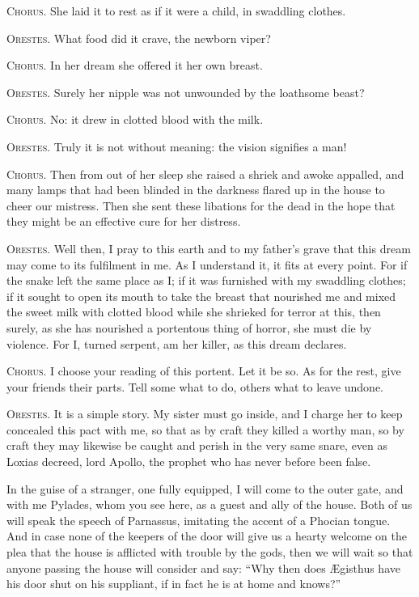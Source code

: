 \documentclass[12pt]{article}
\begin{document}
\textsc{Chorus.} She laid it to rest as if it were a child, in swaddling clothes.

\textsc{Orestes.} What food did it crave, the newborn viper?

\textsc{Chorus.} In her dream she offered it her own breast.

\textsc{Orestes.} Surely her nipple was not unwounded by the loathsome beast?

\textsc{Chorus.} No: it drew in clotted blood with the milk.

\textsc{Orestes.} Truly it is not without meaning: the vision signifies a man!

\textsc{Chorus.} Then from out of her sleep she raised a shriek and awoke appalled, and many lamps that had been blinded in the darkness flared up in the house to cheer our mistress. Then she sent these libations for the dead in the hope that they might be an effective cure for her distress.

\textsc{Orestes.} Well then, I pray to this earth and to my father's grave that this dream may come to its fulfilment in me. As I understand it, it fits at every point. For if the snake left the same place as I; if it was furnished with my swaddling clothes; if it sought to open its mouth to take the breast that nourished me and mixed the sweet milk with clotted blood while she shrieked for terror at this, then surely, as she has nourished a portentous thing of horror, she must die by violence. For I, turned serpent, am her killer, as this dream declares.

\textsc{Chorus.} I choose your reading of this portent. Let it be so. As for the rest, give your friends their parts. Tell some what to do, others what to leave undone.

\textsc{Orestes.} It is a simple story. My sister must go inside, and I charge her to keep concealed this pact with me, so that as by craft they killed a worthy man, so by craft they may likewise be caught and perish in the very same snare, even as Loxias decreed, lord Apollo, the prophet who has never before been false.

In the guise of a stranger, one fully equipped, I will come to the outer gate, and with me Pylades, whom you see here, as a guest and ally of the house. Both of us will speak the speech of Parnassus, imitating the accent of a Phocian tongue. And in case none of the keepers of the door will give us a hearty welcome on the plea that the house is afflicted with trouble by the gods, then we will wait so that anyone passing the house will consider and say: ``Why then does {\AE}gisthus have his door shut on his suppliant, if in fact he is at home and knows?''
\end{document}
